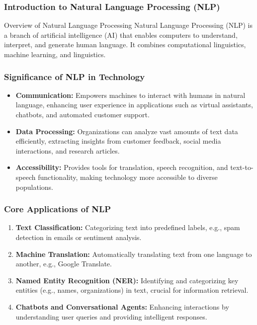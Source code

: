 \documentclass[aspectratio=169]{beamer}
\begin{document}
\frame{\titlepage}

\begin{frame}[fragile]
    \frametitle{Introduction to Natural Language Processing (NLP)}
    \begin{block}{Overview of Natural Language Processing}
        Natural Language Processing (NLP) is a branch of artificial intelligence (AI) that enables computers to understand, interpret, and generate human language. It combines computational linguistics, machine learning, and linguistics.
    \end{block}
\end{frame}

\begin{frame}[fragile]
    \frametitle{Significance of NLP in Technology}
    \begin{itemize}
        \item \textbf{Communication:} Empowers machines to interact with humans in natural language, enhancing user experience in applications such as virtual assistants, chatbots, and automated customer support.
        \item \textbf{Data Processing:} Organizations can analyze vast amounts of text data efficiently, extracting insights from customer feedback, social media interactions, and research articles.
        \item \textbf{Accessibility:} Provides tools for translation, speech recognition, and text-to-speech functionality, making technology more accessible to diverse populations.
    \end{itemize}
\end{frame}

\begin{frame}[fragile]
    \frametitle{Core Applications of NLP}
    \begin{enumerate}
        \item \textbf{Text Classification:} Categorizing text into predefined labels, e.g., spam detection in emails or sentiment analysis.
        \item \textbf{Machine Translation:} Automatically translating text from one language to another, e.g., Google Translate.
        \item \textbf{Named Entity Recognition (NER):} Identifying and categorizing key entities (e.g., names, organizations) in text, crucial for information retrieval.
        \item \textbf{Chatbots and Conversational Agents:} Enhancing interactions by understanding user queries and providing intelligent responses.
    \end{enumerate}
\end{frame}
\end{document}
